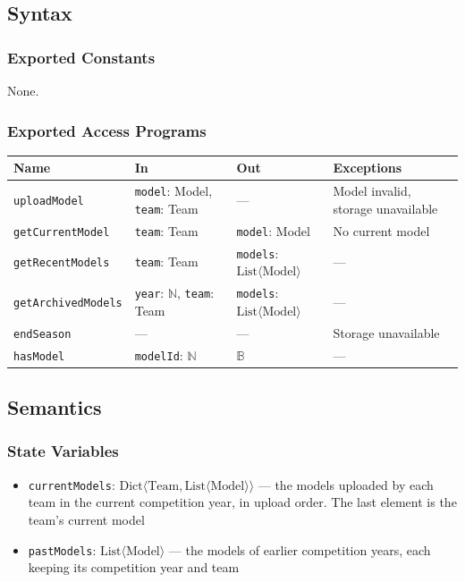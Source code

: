 \documentclass[12pt, titlepage]{article}
\begin{document}
\subsection{Syntax}

\subsubsection{Exported Constants}
None.

\subsubsection{Exported Access Programs}
\begin{tabularx}{\textwidth}{p{3.4cm} p{4cm} p{4.2cm} X}
\toprule
\textbf{Name} & \textbf{In} & \textbf{Out} & \textbf{Exceptions} \\
\midrule
\texttt{uploadModel} & \texttt{model}: Model, \texttt{team}: Team & --- & Model invalid, storage unavailable \\
\texttt{getCurrentModel} & \texttt{team}: Team & \texttt{model}: Model & No current model \\
\texttt{getRecentModels} & \texttt{team}: Team & \texttt{models}: $\text{List}\langle \text{Model} \rangle$ & --- \\
\texttt{getArchivedModels} & \texttt{year}: $\mathbb{N}$, \texttt{team}: Team & \texttt{models}: $\text{List}\langle \text{Model} \rangle$ & --- \\
\texttt{endSeason} & --- & --- & Storage unavailable \\
\texttt{hasModel} & \texttt{modelId}: $\mathbb{N}$ & $\mathbb{B}$ & --- \\
\bottomrule
\end{tabularx}

\subsection{Semantics}

\subsubsection{State Variables}
\begin{itemize}
  \item \texttt{currentModels}: $\text{Dict}\langle \text{Team}, \text{List}\langle \text{Model} \rangle \rangle$ --- the models uploaded by each team in the current competition year, in upload order. The last element is the team's current model
  \item \texttt{pastModels}: $\text{List}\langle \text{Model} \rangle$ --- the models of earlier competition years, each keeping its competition year and team
\end{itemize}
\end{document}
